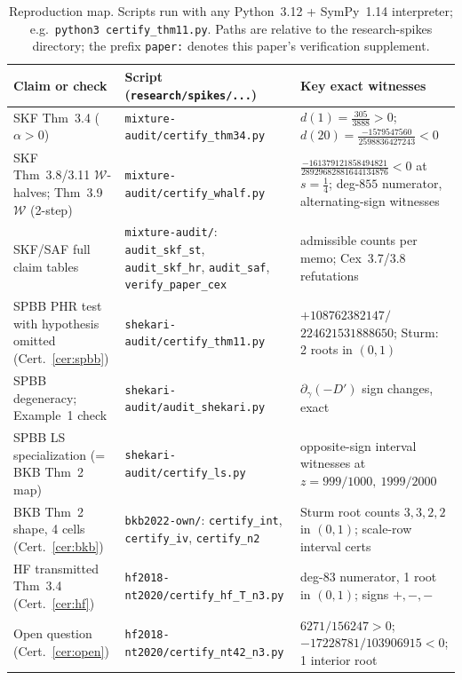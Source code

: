 \documentclass[10pt]{article}
\theoremstyle{plain}
\theoremstyle{definition}
\theoremstyle{remark}
\begin{document}
\begin{table}[h]
\centering\footnotesize
\caption{Reproduction map. Scripts run with any Python~3.12 + SymPy~1.14 interpreter; e.g.\ \texttt{python3 certify\_thm11.py}. Paths are relative to the research-spikes directory; the prefix \texttt{paper:} denotes this paper's verification supplement.}
\label{tab:repro}
\begin{tabular}{@{}>{\raggedright\arraybackslash}p{5.6cm} >{\raggedright\arraybackslash}p{5.2cm} >{\raggedright\arraybackslash}p{4.4cm}@{}}
\toprule
Claim or check & Script (\texttt{research/spikes/...}) & Key exact witnesses \\
\midrule
SKF Thm~3.4 ($\alpha>0$) & \texttt{mixture-audit/certify\_thm34.py} & $d(1)=\tfrac{305}{3888}>0$; $d(20)=\tfrac{-1579547560}{2598836427243}<0$ \\
\addlinespace[2pt]
SKF Thm~3.8/3.11 $\mathcal W$-halves; Thm~3.9 $\mathcal W$ (2-step) & \texttt{mixture-audit/certify\_whalf.py} & $\tfrac{-161379121858494821}{28929682881644134876}<0$ at $s=\tfrac14$; deg-$855$ numerator, alternating-sign witnesses \\
\addlinespace[2pt]
SKF/SAF full claim tables & \texttt{mixture-audit/}: \texttt{audit\_skf\_st}, \texttt{audit\_skf\_hr}, \texttt{audit\_saf}, \texttt{verify\_paper\_cex} & admissible counts per memo; Cex~3.7/3.8 refutations \\
SPBB PHR test with hypothesis omitted (Cert.~\ref{cer:spbb}) & \texttt{shekari-audit/certify\_thm11.py} & $+108762382147/$\newline$224621531888650$; Sturm: 2 roots in $(0,1)$ \\
SPBB degeneracy; Example~1 check & \texttt{shekari-audit/audit\_shekari.py} & $\partial_\gamma(-D')$ sign changes, exact \\
SPBB LS specialization (= BKB Thm~2 map) & \texttt{shekari-audit/certify\_ls.py} & opposite-sign interval witnesses at $z=999/1000,\ 1999/2000$ \\
BKB Thm~2 shape, 4 cells (Cert.~\ref{cer:bkb}) & \texttt{bkb2022-own/}: \texttt{certify\_int}, \texttt{certify\_iv}, \texttt{certify\_n2} & Sturm root counts $3,3,2,2$ in $(0,1)$; scale-row interval certs \\
HF transmitted Thm~3.4 (Cert.~\ref{cer:hf}) & \texttt{hf2018-nt2020/certify\_hf\_T\_n3.py} & deg-$83$ numerator, 1 root in $(0,1)$; signs $+,-,-$ \\
Open question (Cert.~\ref{cer:open}) & \texttt{hf2018-nt2020/certify\_nt42\_n3.py} & $6271/156247>0$; $-17228781/103906915<0$; 1 interior root \\

\end{tabular}
\end{table}
\end{document}
